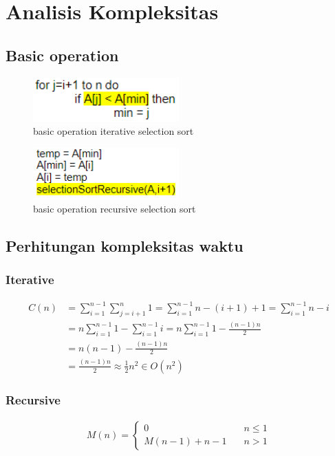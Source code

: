 \documentclass[12pt]{article}
\begin{document}
\newpage
\section{Analisis Kompleksitas}
\subsection{Basic operation}
\begin{figure}[h!]
    \centering
    \includegraphics[width=0.5\textwidth]{images/iterative.PNG}
    \caption{basic operation iterative selection sort}
\end{figure}
\begin{figure}[h!]
    \centering
    \includegraphics[width=0.5\textwidth]{images/recursive.PNG}
    \caption{basic operation recursive selection sort}
\end{figure}
\subsection{Perhitungan kompleksitas waktu}
\subsubsection{Iterative}
\begin{align}
    C(n) &=\sum_{i=1}^{n-1} \sum_{j=i+1}^{n} 1 = \sum_{i=1}^{n-1} {n-(i+1)+1} =\sum_{i=1}^{n-1} {n-i}
    \nonumber
    \\
    &= n\sum_{i=1}^{n-1} 1 - \sum_{i=1}^{n-1} i = n\sum_{i=1}^{n-1} 1 - \frac{(n-1)n}{2}
    \nonumber
    \\
    &= n(n-1) - \frac{(n-1)n}{2}
    \nonumber
    \\
    &= \frac{(n-1)n}{2} \approx \frac{1}{2}n^2 \in O(n^2)
\end{align}
\subsubsection{Recursive}
\begin{align}
    M(n) =
    \begin{cases}
        0 & \quad n \leq 1\\
        M(n-1) + n - 1  & \quad n > 1
    \end{cases}
\end{align}
    
\end{document}
